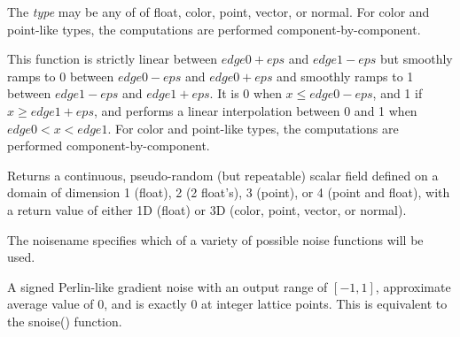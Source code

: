 \documentclass[11pt,letterpaper]{book}
\def\color{{\cf color}\xspace}
\def\float{{\cf float}\xspace}
\def\normal{{\cf normal}\xspace}
\def\point{{\cf point}\xspace}
\def\vector{{\cf vector}\xspace}
\begin{document}
The \emph{type} may be any of of \float, \color, \point, \vector, or
\normal.  For \color and \point-like types, the computations are
performed component-by-component.
\apiend

This function is strictly linear between ${\mathit edge0}+{\mathit eps}$ and ${\mathit edge1}-{\mathit eps}$
but smoothly ramps to 0 between ${\mathit edge0}-{\mathit eps}$ and ${\mathit edge0}+{\mathit eps}$
and smoothly ramps to 1 between ${\mathit edge1}-{\mathit eps}$ and ${\mathit edge1}+{\mathit eps}$.
It is 0 when $x \le {\mathit edge0}-{\mathit eps}$, and 1 if $x \ge {\mathit edge1}+{\mathit eps}$,
and performs a linear
interpolation between 0 and 1 when ${\mathit edge0} < x < {\mathit edge1}$.
For \color and \point-like types, the computations are
performed component-by-component.
\apiend


%


Returns a continuous, pseudo-random (but repeatable) scalar field
defined on a domain of dimension 1 (\float), 2 (2 \float's), 3 (\point),
or 4 (\point and \float), with a return value of either 1D (\float) or 3D
(\color, \point, \vector, or \normal).

The {\cf noisename} specifies which of a variety of possible noise
functions will be used.  

\vspace{12pt}

A signed Perlin-like gradient noise with an output range of $[-1,1]$,
approximate average value of $0$, and is exactly $0$ at integer lattice
points.  This is equivalent to the {\cf snoise()} function.
\end{document}
